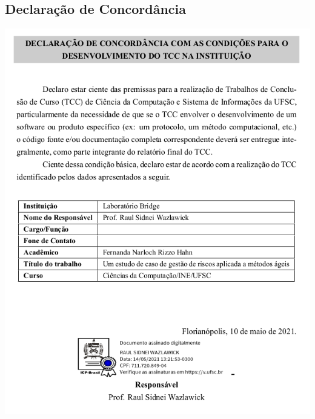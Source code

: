 \documentclass[
    12pt,       %
    openright,      %
    twoside,      %
    a4paper,      %
    english,      %
    french,       %
    spanish,      %
    brazil,       %
    ]{abntex2}
\begin{document}
   \begin{anexosenv}

   \partanexos

   \chapter{Declaração de Concordância}
    \label{sec:anexoA}
    \centering
    \includegraphics[scale=0.75]{src/tex/declaracao.png}


   \end{anexosenv}


  \printindex

  
\end{document}

